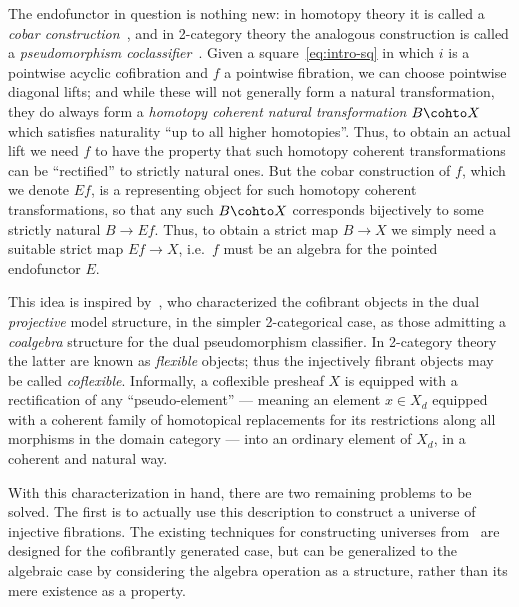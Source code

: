 The endofunctor in question is nothing new: in homotopy theory it is called a \emph{cobar construction}~\cite{may:goils,meyer:bar_i}, and in 2-category theory the analogous construction is called a \emph{pseudomorphism coclassifier}~\cite{bkp:2dmonads,lack:codescent-coh}.
Given a square~\eqref{eq:intro-sq} in which $i$ is a pointwise acyclic cofibration and $f$ a pointwise fibration, we can choose pointwise diagonal lifts; and while these will not generally form a natural transformation, they do always form a \emph{homotopy coherent natural transformation} $B\cohto X$ which satisfies naturality ``up to all higher homotopies''.
Thus, to obtain an actual lift we need $f$ to have the property that such homotopy coherent transformations can be ``rectified'' to strictly natural ones.
But the cobar construction of $f$, which we denote $E f$, is a representing object for such homotopy coherent transformations, so that any such $B\cohto X$ corresponds bijectively to some strictly natural $B\to E f$.
Thus, to obtain a strict map $B\to X$ we simply need a suitable strict map $E f\to X$, i.e.\ $f$ must be an algebra for the pointed endofunctor $E$.

This idea is inspired by~\cite{lack:htpy-2monads}, who characterized the cofibrant objects in the dual \emph{projective} model structure, in the simpler 2-categorical case, as those admitting a \emph{coalgebra} structure for the dual pseudomorphism classifier.
In 2-category theory the latter are known as \emph{flexible} objects; thus the injectively fibrant objects may be called \emph{coflexible}.
Informally, a coflexible presheaf $X$ is equipped with a rectification of any ``pseudo-element'' --- meaning an element $x\in X_d$ equipped with a coherent family of homotopical replacements for its restrictions along all morphisms in the domain category --- into an ordinary element of $X_d$, in a coherent and natural way.

With this characterization in hand, there are two remaining problems to be solved.
The first is to actually use this description to construct a universe of injective fibrations.
The existing techniques for constructing universes from~\cite{klv:ssetmodel,streicher:ttuniv,shulman:elreedy,cisinski:elegant} are designed for the cofibrantly generated case, but can be generalized to the algebraic case by considering the algebra operation as a structure, rather than its mere existence as a property.

